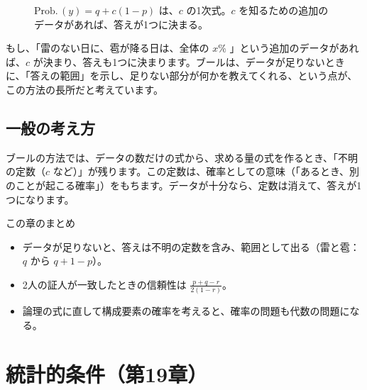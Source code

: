 \documentclass[a4paper,11pt,openany]{ltjsbook}
\newcommand{\Prob}{\mathrm{Prob.}\,}
\begin{document}
\begin{figure}[htbp]
\centering
{}
\caption{$\Prob(y)=q+c(1-p)$ は、$c$ の1次式。$c$ を知るための追加のデータがあれば、答えが1つに決まる。}
\end{figure}

もし、「雷のない日に、雹が降る日は、全体の $x$\% 」という追加のデータがあれば、$c$ が決まり、答えも1つに決まります。ブールは、データが足りないときに、「答えの範囲」を示し、足りない部分が何かを教えてくれる、という点が、この方法の長所だと考えています。

\section{一般の考え方}

ブールの方法では、データの数だけの式から、求める量の式を作るとき、「不明の定数（$c$ など）」が残ります。この定数は、確率としての意味（「あるとき、別のことが起こる確率」）をもちます。データが十分なら、定数は消えて、答えが1つになります。

\begin{pointbox}{この章のまとめ}
\begin{itemize}[leftmargin=*]
\item データが足りないと、答えは不明の定数を含み、範囲として出る（雷と雹：$q$ から $q+1-p$）。
\item 2人の証人が一致したときの信頼性は $\tfrac{p+q-r}{2(1-r)}$。
\item 論理の式に直して構成要素の確率を考えると、確率の問題も代数の問題になる。
\end{itemize}
\end{pointbox}

\chapter{統計的条件（第19章）}
\end{document}
